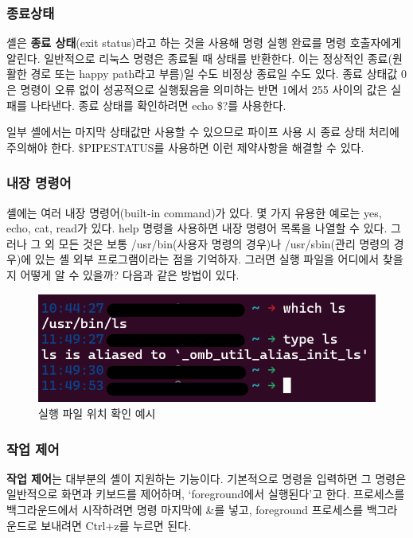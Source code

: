 \subsubsection*{종료상태}
\begin{flushleft}
    셸은 \textbf{종료 상태}(exit status)라고 하는 것을 사용해 명령 실행 완료를 명령 호출자에게 알린다.
    일반적으로 리눅스 명령은 종료될 때 상태를 반환한다.
    이는 정상적인 종료(원활한 경로 또는 happy path라고 부름)일 수도 비정상 종료일 수도 있다.
    종료 상태값 0은 명령이 오류 없이 성공적으로 실행됬음을 의미하는 반면
    1에서 255 사이의 값은 실패를 나타낸다.
    종료 상태를 확인하려면 echo \$?를 사용한다.
\end{flushleft}

\begin{flushleft}
    일부 셸에서는 마지막 상태값만 사용할 수 있으므로
    파이프 사용 시 종료 상태 처리에 주의해야 한다.
    \$PIPESTATUS를 사용하면 이런 제약사항을 해결할 수 있다.
\end{flushleft}

\subsubsection*{내장 명령어}
\begin{flushleft}
    셸에는 여러 내장 명령어(built-in command)가 있다.
    몇 가지 유용한 예로는 yes, echo, cat, read가 있다.
    help 명령을 사용하면 내장 명령어 목록을 나열할 수 있다.
    그러나 그 외 모든 것은 보통 /usr/bin(사용자 명령의 경우)나 /usr/sbin(관리 명령의 경우)에 있는
    셸 외부 프로그램이라는 점을 기억하자.
    그러면 실행 파일을 어디에서 찾을지 어떻게 알 수 있을까?
    다음과 같은 방법이 있다.
\end{flushleft}

\begin{figure}[H]
    \includegraphics[width=15cm]{resource/3-built-in}
    \caption{실행 파일 위치 확인 예시}
    \label{fig:build-in}
\end{figure}


\subsubsection*{작업 제어}
\begin{flushleft}
    \textbf{작업 제어}는 대부분의 셸이 지원하는 기능이다.
    기본적으로 명령을 입력하면 그 명령은 일반적으로 화면과 키보드를 제어하며,
    `foreground에서 실행된다'고 한다.
    프로세스를 백그라운드에서 시작하려면 명령 마지막에 \&를 넣고,
    foreground 프로세스를 백그라운드로 보내려면 Ctrl+z를 누르면 된다.
\end{flushleft}

